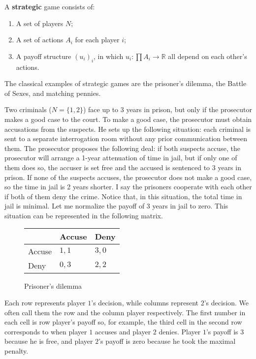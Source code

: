 \documentclass[../../main.tex]{subfiles}
\begin{document}
    \begin{mydef}
        A \textbf{strategic} game consists of:
        \begin{enumerate}
            \item A set of players $N$;
            \item A set of actions $A_i$ for each player $i$;
            \item A payoff structure $(u_i)_i$, in which $u_i\colon \prod A_i\to\mathbb{R}$ all depend on each other's actions.
        \end{enumerate}
    \end{mydef}
    The classical examples of strategic games are the prisoner's dilemma, the Battle of Sexes, and matching pennies.
    \begin{myex}
    \label{PDil}
        Two criminals ($N = \{1,2\}$) face up to 3 years in prison, but only if the prosecutor makes a good case to the court. To make a good case, the prosecutor must obtain accusations from the suspects. He sets up the following situation: each criminal is sent to a separate interrogation room without any prior communication between them. The prosecutor proposes the following deal: if both suspects accuse, the prosecutor will arrange a 1-year attenuation of time in jail, but if only one of them does so, the accuser is set free and the accused is sentenced to 3 years in prison. If none of the suspects accuses, the prosecutor does not make a good case, so the time in jail is 2 years shorter. I say the prisoners cooperate with each other if both of them deny the crime. Notice that, in this situation, the total time in jail is minimal. Let me normalize the payoff of 3 years in jail to zero. This situation can be represented in the following matrix.
        \begin{figure}[htb]
            \centering
            \begin{tabular}{l|l|l}
                  & Accuse  & Deny \\ \hline
                    Accuse      & $1,1$ & $3,0$     \\ \hline
                    Deny & $0,3$ & $2,2$    
            \end{tabular}
            \caption{Prisoner's dilemma}
            \label{fig:PDil}
        \end{figure}
        Each row represents player $1$'s decision, while columns represent $2$'s decision. We often call them the row and the column player respectively. The first number in each cell is row player's payoff so, for example, the third cell in the second row corresponds to when player $1$ accuses and player $2$ denies. Player $1$'s payoff is $3$ because he is free, and player $2$'s payoff is zero because he took the maximal penalty.
    \end{myex}
\end{document}
